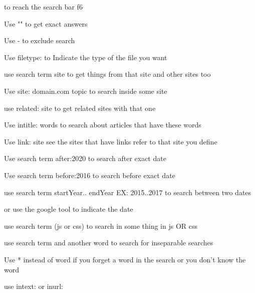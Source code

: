 to reach the search bar 
  f6

Use ""
  to get exact answers 

Use - 
  to exclude search

Use filetype: 
  to Indicate the type of the file you want 

use search term site 
  to get things from that site and other sites too 

Use site: domain.com  topic 
  to search inside some site 


use related: site 
  to get related sites with that one 

Use intitle: words
  to search about articles that have these words 

Use link: site 
  see the sites that have links refer to that site you define 

Use search term after:2020
  to search after exact date

Use search term before:2016 
  to search before exact date 

use search term startYear.. endYear  EX: 2015..2017
  to search between two dates 

or use the google tool to indicate the date 

use search term (js or css)
  to search in some thing in js OR css 

use search term  and another word 
  to search for inseparable searches 

Use *  instead of word 
  if you forget a word in the search or you don't know the word  

use intext:  or inurl: 